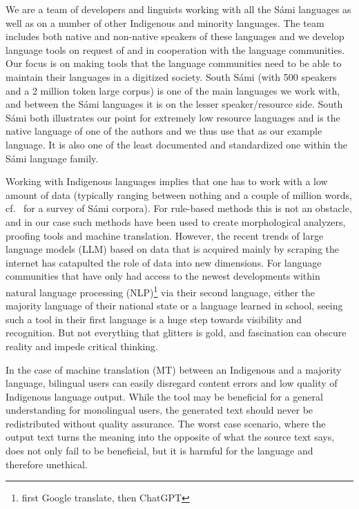 \documentclass[free]{flammie}
\begin{document}
We are a team of developers and linguists  working with all the Sámi languages
as well as on a number of other Indigenous and minority languages.  The team
includes both native and non-native speakers of these languages and we develop
language tools on request of and in cooperation with the language communities.
Our focus is on making tools that the language communities need to be able to
maintain their languages in a digitized society.  South Sámi (with 500 speakers
and a 2 million token large  corpus) is one of the main languages we work with,
and between the Sámi languages it is on the lesser speaker/resource side.  South
Sámi both illustrates our point for extremely low resource languages and is the
native language of one of the authors and we thus use that as our example
language.  It is also one of the least documented and standardized one within
the Sámi language family.



Working with Indigenous languages implies that one has to work with a low amount
of data (typically ranging between nothing and a couple of million words,
cf.~\cite{antonsen2020samiske} for a survey of Sámi corpora). For rule-based
methods this is not an obstacle, and in our case such methods have been used to
create morphological analyzers, proofing tools and machine translation. However,
the recent trends of large language models (LLM) based on data that is acquired
mainly by scraping the internet has catapulted the role of data into new
dimensions.  For language communities that have only had access to the newest
developments within natural language processing (NLP)\footnote{first Google
translate, then ChatGPT} via their second language, either the majority language
of their national state or a language learned in school, seeing such a tool in
their first language is a huge step towards visibility and recognition. But not
everything that glitters is gold, and fascination can obscure reality and impede
critical thinking.

In the case of machine translation (MT) between an Indigenous and a majority
language, bilingual users can easily disregard content errors and low quality of
Indigenous language output.  While the tool may be beneficial for a general
understanding for monolingual users, the generated text should never be
redistributed without quality assurance. The worst case scenario, where the
output text turns the meaning into the opposite of what the source text says,
does not only fail to be  beneficial, but it is harmful for the language and
therefore unethical.
\end{document}

